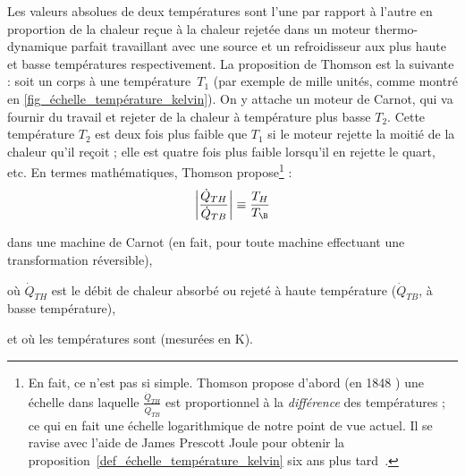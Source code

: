 			Les valeurs absolues de deux températures sont l’une par rapport à l’autre en proportion de la chaleur reçue à la chaleur rejetée dans un moteur thermo-dynamique parfait travaillant avec une source et un refroidisseur aux plus haute et basse températures respectivement.
		La proposition de Thomson est la suivante : soit un corps à une température~$T_1$ (par exemple de mille unités, comme montré en \cref{fig_échelle_température_kelvin}). On y attache un moteur de Carnot, qui va fournir du travail et rejeter de la chaleur à température plus basse $T_2$. Cette température $T_2$ est deux fois plus faible que $T_1$ si le moteur rejette la moitié de la chaleur qu’il reçoit ; elle est quatre fois plus faible lorsqu’il en rejette le quart, etc. En termes mathématiques, Thomson propose\footnote{En fait, ce n’est pas si simple. Thomson propose d’abord (en 1848 \cite{kelvin1848}) une échelle dans laquelle $\frac{\dot Q_{TH}}{\dot Q_{TB}}$ est proportionnel à la \emph{différence} des températures ; ce qui en fait une échelle logarithmique de notre point de vue actuel. Il se ravise avec l’aide de James Prescott Joule pour obtenir la proposition~\ref{def_échelle_température_kelvin} six ans plus tard~\cite{kelvinjoule1854}.} :
		\begin{equation}
			\left| \frac{\dot Q_{TH}}{\dot Q_{TB}} \right| \equiv \frac{T_H}{T_\B }
			\label{def_échelle_température_kelvin}
		\end{equation}
		\begin{equationterms}
			\item dans une machine de Carnot (en fait, pour toute machine effectuant une transformation réversible),
			\item où \tab $\dot Q_{TH}$ \tab est le débit de chaleur absorbé ou rejeté à haute température ($\dot Q_{TB}$, à basse température),
			\item et où les températures sont  (mesurées en \si{\kelvin}).
		\end{equationterms}

